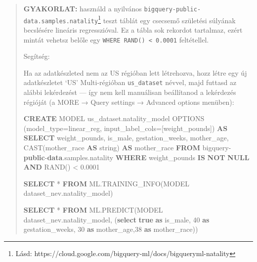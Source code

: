 \documentclass[
  magyar,
]{article}
\newenvironment{Shaded}{}{}
\newcommand{\DecValTok}[1]{\textcolor[rgb]{0.25,0.63,0.44}{#1}}
\newcommand{\FloatTok}[1]{\textcolor[rgb]{0.25,0.63,0.44}{#1}}
\newcommand{\FunctionTok}[1]{\textcolor[rgb]{0.02,0.16,0.49}{#1}}
\newcommand{\KeywordTok}[1]{\textcolor[rgb]{0.00,0.44,0.13}{\textbf{#1}}}
\newcommand{\NormalTok}[1]{#1}
\newcommand{\OperatorTok}[1]{\textcolor[rgb]{0.40,0.40,0.40}{#1}}
\newcommand{\StringTok}[1]{\textcolor[rgb]{0.25,0.44,0.63}{#1}}
\begin{document}
\begin{quote}
\textbf{GYAKORLAT:} használd a nyilvános
\texttt{bigquery-public-data.samples.natality}\footnote{Lásd:
  https://cloud.google.com/bigquery-ml/docs/bigqueryml-natality} teszt
táblát egy csecsemő születési súlyának becslésére lineáris
regresszióval. Ez a tábla sok rekordot tartalmaz, ezért mintát vehetsz
belőle egy \texttt{WHERE\ RAND()\ \textless{}\ 0.0001} feltétellel.

Segítség:

Ha az adatkészleted nem az US régióban lett létrehozva, hozz létre egy
új adatkészletet `US' Multi-régióban \texttt{us\_dataset} névvel, majd
futtasd az alábbi lekérdezést --- így nem kell manuálisan beállítanod a
lekérdezés régióját (a MORE → Query settings → Advanced options
menüben):

\begin{Shaded}
\begin{Highlighting}[]
\KeywordTok{CREATE}\NormalTok{ MODEL \textasciigrave{}us\_dataset.natality\_model\textasciigrave{}}
\NormalTok{OPTIONS}
\NormalTok{  (model\_type}\OperatorTok{=}\StringTok{\textquotesingle{}linear\_reg\textquotesingle{}}\NormalTok{,}
\NormalTok{    input\_label\_cols}\OperatorTok{=}\NormalTok{[}\StringTok{\textquotesingle{}weight\_pounds\textquotesingle{}}\NormalTok{]) }\KeywordTok{AS}
\KeywordTok{SELECT}
\NormalTok{  weight\_pounds,}
\NormalTok{  is\_male,}
\NormalTok{  gestation\_weeks,}
\NormalTok{  mother\_age,}
  \FunctionTok{CAST}\NormalTok{(mother\_race }\KeywordTok{AS}\NormalTok{ string) }\KeywordTok{AS}\NormalTok{ mother\_race}
\KeywordTok{FROM}
\NormalTok{  \textasciigrave{}bigquery}\OperatorTok{{-}}\KeywordTok{public}\OperatorTok{{-}}\KeywordTok{data}\NormalTok{.samples.natality\textasciigrave{}}
\KeywordTok{WHERE}
\NormalTok{  weight\_pounds }\KeywordTok{IS} \KeywordTok{NOT} \KeywordTok{NULL} \KeywordTok{AND}\NormalTok{ RAND() }\OperatorTok{\textless{}} \FloatTok{0.0001}

\KeywordTok{SELECT}  \OperatorTok{*} \KeywordTok{FROM}\NormalTok{  ML.TRAINING\_INFO(MODEL \textasciigrave{}dataset\_nev.natality\_model\textasciigrave{})}

\KeywordTok{SELECT} \OperatorTok{*} \KeywordTok{FROM}\NormalTok{ ML.PREDICT(MODEL \textasciigrave{}dataset\_nev.natality\_model\textasciigrave{},}
\NormalTok{(}\KeywordTok{select} \KeywordTok{true} \KeywordTok{as}\NormalTok{ is\_male, }\DecValTok{40} \KeywordTok{as}\NormalTok{ gestation\_weeks, }\DecValTok{30} \KeywordTok{as}\NormalTok{ mother\_age,}\StringTok{\textquotesingle{}38\textquotesingle{}} \KeywordTok{as}\NormalTok{ mother\_race))}
\end{Highlighting}
\end{Shaded}
\end{quote}
\end{document}
